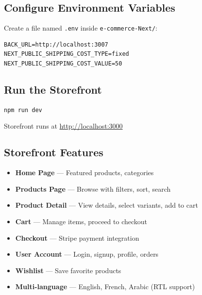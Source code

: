 \documentclass[12pt,a4paper]{article}
\begin{document}
\subsection{Configure Environment Variables}

Create a file named \texttt{.env} inside \texttt{e-commerce-Next/}:

\begin{lstlisting}[caption=.env for storefront]
BACK_URL=http://localhost:3007
NEXT_PUBLIC_SHIPPING_COST_TYPE=fixed
NEXT_PUBLIC_SHIPPING_COST_VALUE=50
\end{lstlisting}

\subsection{Run the Storefront}

\begin{lstlisting}[language=bash, caption=Start storefront]
npm run dev
\end{lstlisting}

\begin{tcolorbox}[colback=green!5!white,colframe=successgreen]
    Storefront runs at \url{http://localhost:3000}
\end{tcolorbox}

\subsection{Storefront Features}

\begin{itemize}
    \item \textbf{Home Page} — Featured products, categories
    \item \textbf{Products Page} — Browse with filters, sort, search
    \item \textbf{Product Detail} — View details, select variants, add to cart
    \item \textbf{Cart} — Manage items, proceed to checkout
    \item \textbf{Checkout} — Stripe payment integration
    \item \textbf{User Account} — Login, signup, profile, orders
    \item \textbf{Wishlist} — Save favorite products
    \item \textbf{Multi-language} — English, French, Arabic (RTL support)
\end{itemize}

\newpage
\end{document}

